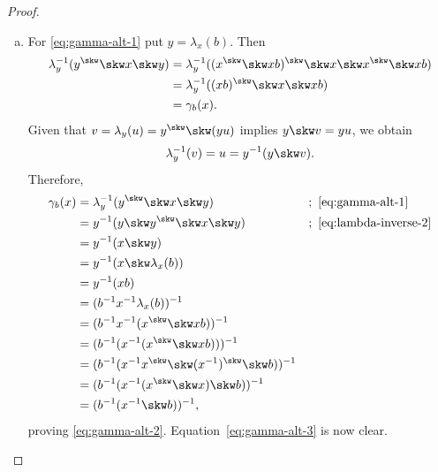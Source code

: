 \begin{proof}${}$
    \begin{enumerate}[a),font=\upshape]
        \item For \eqref{eq:gamma-alt-1} put $y=\lambda_x(b)$. Then
            \begin{align*}
                \lambda_y^{-1}(y^\skw\skw x\skw y)
                    &= \lambda_y^{-1}((x^\skw\skw xb)^\skw
                        \skw x\skw x^\skw\skw xb)\\
                    &= \lambda_y^{-1}((xb)^\skw\skw x\skw xb)\\
                    &= \gamma_b(x).
            \end{align*}
    Given that $v = \lambda_y(u) = y^\skw\skw (yu)$ implies $y\skw v = yu$,
    we obtain
    \begin{equation}\label{eq:lambda-inverse-2}
        \lambda_y^{-1}(v) = u = y^{-1}(y\skw v).
    \end{equation}
    Therefore,
    \begin{align*}
        \gamma_b(x) &= \lambda_y^{-1}(y^\skw\skw x\skw y)
                &&;\ \eqref{eq:gamma-alt-1}\\
            &= y^{-1}(y\skw y^\skw\skw x\skw y)
                &&;\ \eqref{eq:lambda-inverse-2}\\
            &= y^{-1}(x\skw y)\\
            &= y^{-1}(x\skw \lambda_x(b))\\
            &= y^{-1}(xb)\\
            &= (b^{-1}x^{-1}\lambda_x(b))^{-1}\\
            &= (b^{-1}x^{-1}(x^\skw\skw xb))^{-1}\\
            &= (b^{-1}(x^{-1}(x^\skw\skw xb)))^{-1}\\
            &= (b^{-1}(x^{-1}x^\skw\skw(x^{-1})^\skw\skw b))^{-1}\\
            &= (b^{-1}(x^{-1}(x^\skw\skw x)\skw b))^{-1}\\
            &= (b^{-1}(x^{-1}\skw b))^{-1},
    \end{align*}
    proving \eqref{eq:gamma-alt-2}. Equation~\eqref{eq:gamma-alt-3} is now clear.


\end{enumerate}
\end{proof}
